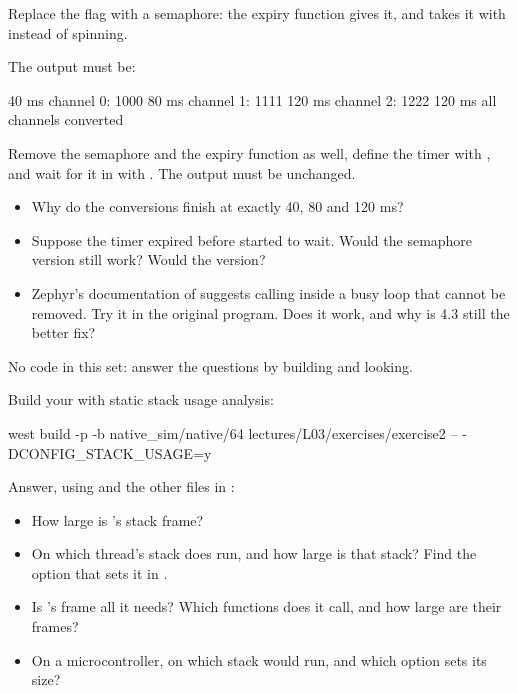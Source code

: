 \label{c3:ex:4.2}

Replace the flag with a semaphore: the expiry function gives it, and  takes it with
 instead of spinning.

The output must be:

\begin{console}
 40 ms  channel 0: 1000
 80 ms  channel 1: 1111
120 ms  channel 2: 1222
120 ms  all channels converted
\end{console}

\label{c3:ex:4.3}

Remove the semaphore and the expiry function as well, define the timer with
, and wait for it in  with
. The output must be unchanged.

\begin{itemize}
  \item Why do the conversions finish at exactly 40, 80 and 120 ms?
  \item Suppose the timer expired before  started to wait. Would the semaphore version still
    work? Would the  version?
  \item Zephyr’s documentation of  suggests calling  inside a busy loop
    that cannot be removed. Try it in the original program. Does it work, and why is 4.3 still the
    better fix?
\end{itemize}

\label{c3:set:5}
No code in this set: answer the questions by building and looking.

\label{c3:ex:5.1}

Build your  with static stack usage analysis:

\begin{shell}
west build -p -b native_sim/native/64 lectures/L03/exercises/exercise2 -- -DCONFIG_STACK_USAGE=y
\end{shell}

\noindent Answer, using  and the other  files
in :

\begin{itemize}
  \item How large is ’s stack frame?
  \item On which thread’s stack does  run, and how large is that stack? Find the
    option that sets it in .
  \item Is ’s frame all it needs? Which functions does it call, and how large are
    their frames?
  \item On a microcontroller, on which stack would  run, and which option sets its
    size?
\end{itemize}

